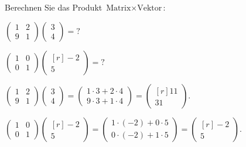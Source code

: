 Berechnen Sie das Produkt $\text{Matrix}\times\text{Vektor}$:
\begin{teilaufgaben}
\item
$
\begin{pmatrix} 1&2\\9&1\end{pmatrix}
\begin{pmatrix} 3\\4\end{pmatrix}
=
\text{?}
$
\item $
\begin{pmatrix} 1&0\\0&1\end{pmatrix}
\begin{pmatrix*}[r] -2\\5\end{pmatrix*}
=
\text{?}
$
\end{teilaufgaben}

\begin{loesung}
\begin{teilaufgaben}
\item
\(
\begin{pmatrix} 1&2\\9&1\end{pmatrix}
\begin{pmatrix} 3\\4\end{pmatrix}
=
\begin{pmatrix}
1\cdot 3+2\cdot 4 \\
9\cdot 3+1\cdot 4
\end{pmatrix}
=
\begin{pmatrix*}[r]
11\\31
\end{pmatrix*}
\).
\item
\(
\begin{pmatrix} 1&0\\0&1\end{pmatrix}
\begin{pmatrix*}[r] -2\\5\end{pmatrix*}
=
\begin{pmatrix}
1\cdot (-2) + 0\cdot 5\\
0\cdot (-2) + 1\cdot 5
\end{pmatrix}
=
\begin{pmatrix*}[r] -2\\5\end{pmatrix*}
\).
\qedhere
\end{teilaufgaben}
\end{loesung}
